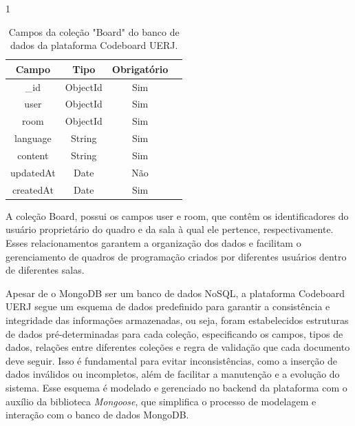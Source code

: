 \begin{table}[H]{1\textwidth}
    \centering
    \caption{Campos da coleção "Board" do banco de dados da plataforma Codeboard UERJ.}
    \label{tab:board-collection-fields}
    \renewcommand{\arraystretch}{1.3} 
    \begin{tabular}{|c|c|c|c|}
        \hline
        \textbf{Campo}             & \textbf{Tipo} & \textbf{Obrigatório} \\
        \hline
        \_id             & ObjectId      & Sim                  \\
        \hline
        user          & ObjectId      & Sim                  \\
        \hline
        room          & ObjectId      & Sim                  \\
        \hline
        language           & String        & Sim                  \\
        \hline
        content                 & String        & Sim                  \\
        \hline
        updatedAt         & Date          & Não                  \\
        \hline
        createdAt          & Date          & Sim                  \\
        \hline
    \end{tabular}
\end{table}

A coleção Board, possui os campos user e room, que contêm os identificadores do usuário proprietário do quadro e da sala à qual ele pertence, respectivamente. Esses relacionamentos garantem a organização dos dados e facilitam o gerenciamento de quadros de programação criados por diferentes usuários dentro de diferentes salas.

Apesar de o MongoDB ser um banco de dados NoSQL, a plataforma Codeboard UERJ segue um esquema de dados predefinido para garantir a consistência e integridade das informações armazenadas, ou seja, foram estabelecidos estruturas de dados pré-determinadas para cada coleção, especificando os campos, tipos de dados, relações entre diferentes coleções e regra de validação que cada documento deve seguir. Isso é fundamental para evitar inconsistências, como a inserção de dados inválidos ou incompletos, além de facilitar a manutenção e a evolução do sistema. Esse esquema é modelado e gerenciado no backend da plataforma com o auxílio da biblioteca \emph{Mongoose}, que simplifica o processo de modelagem e interação com o banco de dados MongoDB.


